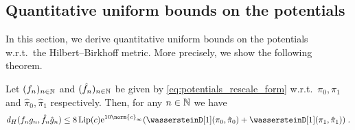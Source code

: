 \documentclass[11pt,a4paper]{article}
\providecommand{\DIFaddbegin}{} %
\providecommand{\DIFaddend}{} %
\begin{document}

\subsection{Quantitative uniform bounds on the potentials}
\label{sec:quant-unif-bounds}

In this section, we derive quantitative uniform bounds on the potentials w.r.t.\ 
the Hilbert--Birkhoff metric. More precisely, we show the following theorem.

\begin{theorem}
  \label{thm:contract_hilbert}
  Let $(f_n)_{n \in \mathbb{N}}$ and $(\hat{f}_n)_{n \in \mathbb{N}}$ be given by
  \eqref{eq:potentials_rescale_form} w.r.t.\  $\pi_0, \pi_1$ and
  $\hat{\pi}_0, \hat{\pi}_1$ respectively. Then, for any $n \in \mathbb{N}$ we have
  \begin{equation}
    d_H(f_ng_n, \hat{f}_n\hat{g}_n) \leq 8 \Lip(c) \rme^{10 \norm{c}_\infty} (\wassersteinD[1](\pi_0, \hat{\pi}_0) + \wassersteinD[1](\pi_1, \hat{\pi}_1)) \DIFaddbegin \eqsp \DIFaddend . 
  \end{equation}
\end{theorem}
\end{document}
